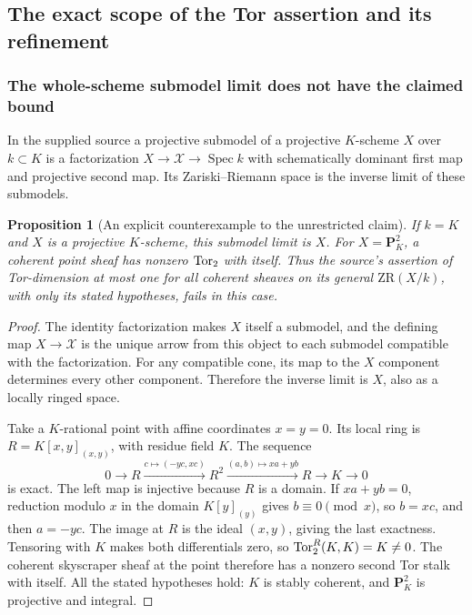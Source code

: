 \documentclass[11pt,a4paper]{article}
\newtheorem{proposition}[theorem]{Proposition}
\theoremstyle{definition}\newtheorem{definition}[theorem]{Definition}
\newcommand{\Spec}{\operatorname{Spec}}\newcommand{\SpecMon}{\operatorname{Spec}_{\mathrm{mon}}}
\begin{document}
\subsection{The exact scope of the Tor assertion and its refinement}
\label{sec:repair}

\subsubsection{The whole-scheme submodel limit does not have the claimed bound}

In the supplied source a projective submodel of a projective $K$-scheme
$X$ over $k\subset K$ is a factorization $X\to\mathcal X\to\Spec k$
with schematically dominant first map and projective second map.
Its Zariski--Riemann space is the inverse limit of these submodels.

\begin{proposition}[An explicit counterexample to the unrestricted claim]
\label{prop:source-counterexample}
If $k=K$ and $X$ is a projective $K$-scheme, this submodel limit is $X$.
For $X=\mathbf P^2_K$, a coherent point sheaf has nonzero $\operatorname{Tor}_2$ with
itself. Thus the source's assertion of Tor-dimension at most one for
all coherent sheaves on its general $\mathrm{ZR}(X/k)$, with only its
stated hypotheses, fails in this case.
\end{proposition}
\begin{proof}
The identity factorization makes $X$ itself a submodel, and the defining
map $X\to\mathcal X$ is the unique arrow from this object to each
submodel compatible with the factorization. For any compatible cone,
its map to the $X$ component determines every other component.
Therefore the inverse limit is $X$, also as a locally ringed space.

Take a $K$-rational point with affine coordinates $x=y=0$. Its local ring
is $R=K[x,y]_{(x,y)}$, with residue field $K$. The sequence
\[
 0\longrightarrow R\xrightarrow{c\mapsto(-yc,xc)}R^2
 \xrightarrow{(a,b)\mapsto xa+yb}R\longrightarrow K\longrightarrow0
 \tag{AV7.1}\label{eq:koszul}
\]
is exact. The left map is injective because $R$ is a domain. If
$xa+yb=0$, reduction modulo $x$ in the domain $K[y]_{(y)}$ gives
$b\equiv0\pmod x$, so $b=xc$, and then $a=-yc$. The image at $R$ is
the ideal $(x,y)$, giving the last exactness. Tensoring with $K$ makes
both differentials zero, so $\operatorname{Tor}_2^R(K,K)=K\ne0$.
The coherent skyscraper sheaf at the point therefore has a nonzero
second Tor stalk with itself. All the stated hypotheses hold: $K$ is
stably coherent, and $\mathbf P^2_K$ is projective and integral.
\end{proof}
\end{document}
